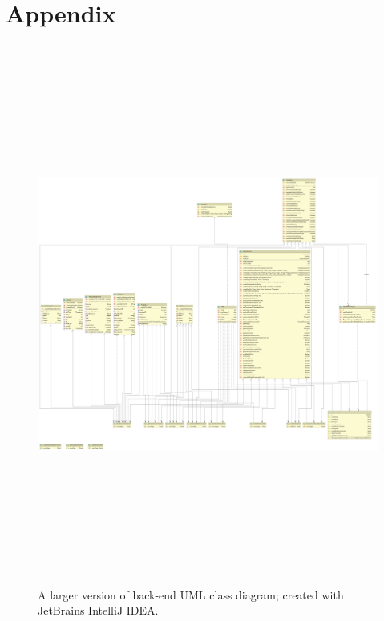 \documentclass[9pt, titlepage]{extarticle}
\begin{document}
\printbibliography[heading=bibintoc]

\newpage

\section{Appendix}
\appendix

\begin{figure}[H]
    \centering
    \includegraphics[height=7in,angle=90]{images/uml.png}
    \caption{A larger version of back-end UML class diagram; created with JetBrains IntelliJ IDEA.}
    \label{fig:uml-sideways}
\end{figure}
\end{document}
